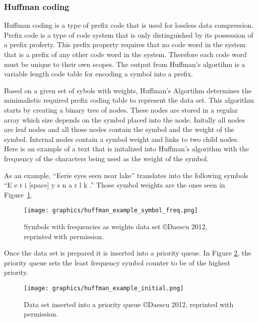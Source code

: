 \documentclass[letterpaper, 11pt]{article}
\begin{document}
\subsubsection{Huffman coding}
Huffman coding is a type of prefix code that is used for lossless data compression. Prefix code is a type
of code system that is only distinguished by its possession of a prefix proferty. This prefix property requires
that no code word in the system that is a prefix of any other code word in the system. Therefore each code word
must be unique to their own scopes. The output from Huffman's algortihm is a variable length code table for encoding
a symbol into a prefix.
\par\vspace{\baselineskip}
Based on a given set of sybols with weights, Huffman's Algortihm determines the minimalistic required prefix coding
table to represent the data set. This algorithm starts by creating a binary tree of nodes. These nodes
are stored in a regular array which size depends on the symbol placed into the node. Initally all nodes are leaf
nodes and all those nodes contain the symbol and the weight of the symbol. Internal nodes contain a symbol weight
and links to two child nodes. Here is an example of a text that is initalized into Huffman's algorithm with the
frequency of the characters being used as the weight of the symbol.
\par\vspace{\baselineskip}
As an example, ``Eerie eyes seen near lake'' translates into the following symbols ``E e r i [space] y s n a r l k .''
Those symbol weights are the ones seen in Figure~\ref{fig:huffman_ex_sym_freq}.
\par\vspace{\baselineskip}

\begin{figure}[H]
  \centering
  \texttt{[image: graphics/huffman\_example\_symbol\_freq.png]}
  \caption{Symbols with frequencies as weights data set \copyright Daescu 2012, reprinted with permission.\cite{huffman}}
  \label{fig:huffman_ex_sym_freq}
\end{figure}

Once the data set is prepared it is inserted into a priority queue. In Figure \ref{huff_example}, the priority 
queue sets the least frequency symbol counter to be of the highest priority.
\par\vspace{\baselineskip}

\begin{figure}
  \centering
  \texttt{[image: graphics/huffman\_example\_initial.png]}
  \caption{Data set inserted into a priority queue  \copyright Daescu 2012, reprinted with permission.\cite{huffman}}
  \label{huff_example}
\end{figure}
\end{document}
